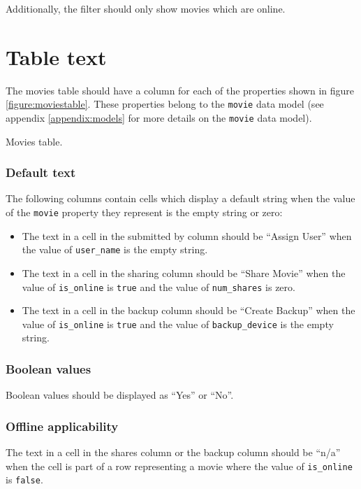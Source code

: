\noindent Additionally, the filter should only show movies which are online.

\section{Table text}

The movies table should have a column for each of the properties shown in figure 
\ref{figure:moviestable}. These properties belong to the \texttt{movie} data model (see appendix 
\ref{appendix:models} for more details on the \texttt{movie} data model). 

\begin{table}[h]
    
    \caption{Movies table.}
    \label{figure:moviestable}
\end{table}

\subsubsection{Default text}

\noindent The following columns contain cells which display a default string when the 
value of the \texttt{movie} property they represent is the empty string or zero:
\begin{itemize}
    \item The text in a cell in the submitted by column should be ``Assign User''
    when the value of \texttt{user\_name} is the empty string.
    \item The text in a cell in the sharing column should be ``Share Movie'' when the
    value of \texttt{is\_online} is \texttt{true} and the value of \texttt{num\_shares} is zero.
    \item The text in a cell in the backup column should be ``Create Backup'' when the
    value of \texttt{is\_online} is \texttt{true} and the value of \texttt{backup\_device} is the empty string.
\end{itemize}

\subsubsection{Boolean values}

Boolean values should be displayed as ``Yes'' or ``No''.

\subsubsection{Offline applicability}

The text in a cell in the shares column or the backup column should be ``n/a'' when the cell 
is part of a row representing a movie where the value of \texttt{is\_online} is \texttt{false}.
